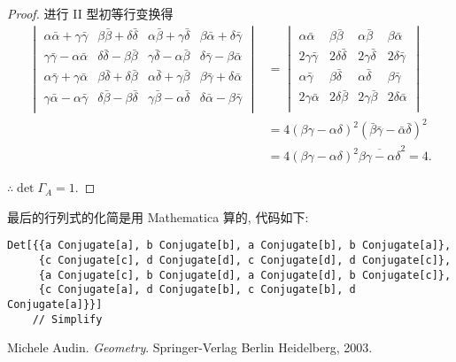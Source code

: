 \documentclass{ctexart}
\begin{document}
\begin{proof}
    进行 II 型初等行变换得
    \begin{align*}
        \begin{vmatrix}
            \alpha\bar{\alpha}+\gamma\bar{\gamma} & \beta\bar{\beta}+\delta\bar{\delta} & \alpha\bar{\beta}+\gamma\bar{\delta} & \beta\bar{\alpha}+\delta\bar{\gamma} \\
            \gamma\bar{\gamma}-\alpha\bar{\alpha} & \delta\bar{\delta}-\beta\bar{\beta} & \gamma\bar{\delta}-\alpha\bar{\beta} & \delta\bar{\gamma}-\beta\bar{\alpha} \\
            \alpha\bar{\gamma}+\gamma\bar{\alpha} & \beta\bar{\delta}+\delta\bar{\beta} & \alpha\bar{\delta}+\gamma\bar{\beta} & \beta\bar{\gamma}+\delta\bar{\alpha} \\
            \gamma\bar{\alpha}-\alpha\bar{\gamma} & \delta\bar{\beta}-\beta\bar{\delta} & \gamma\bar{\beta}-\alpha\bar{\delta} & \delta\bar{\alpha}-\beta\bar{\gamma} \\
        \end{vmatrix} & =\begin{vmatrix}
            \alpha\bar{\alpha} & \beta\bar{\beta} & \alpha\bar{\beta} & \beta\bar{\alpha} \\
            2\gamma\bar{\gamma} & 2\delta\bar{\delta} & 2\gamma\bar{\delta} & 2\delta\bar{\gamma} \\
            \alpha\bar{\gamma} & \beta\bar{\delta} & \alpha\bar{\delta} & \beta\bar{\gamma} \\
            2\gamma\bar{\alpha} & 2\delta\bar{\beta} & 2\gamma\bar{\beta} & 2\delta\bar{\alpha} \\
        \end{vmatrix} \\
        & =4(\beta\gamma-\alpha\delta)^2(\bar{\beta}\bar{\gamma}-\bar{\alpha}\bar{\delta})^2 \\
        & =4(\beta\gamma-\alpha\delta)^2\overline{\beta\gamma-\alpha\delta}^2=4.
    \end{align*}

    $\therefore\det\Gamma_A=1$.
\end{proof}
\begin{note}
    最后的行列式的化简是用 Mathematica 算的, 代码如下:
    \begin{verbatim}
Det[{{a Conjugate[a], b Conjugate[b], a Conjugate[b], b Conjugate[a]},
     {c Conjugate[c], d Conjugate[d], c Conjugate[d], d Conjugate[c]},
     {a Conjugate[c], b Conjugate[d], a Conjugate[d], b Conjugate[c]},
     {c Conjugate[a], d Conjugate[b], c Conjugate[b], d Conjugate[a]}}]
    // Simplify
    \end{verbatim}
\end{note}
\begin{thebibliography}{99}
     Michele Audin. \textit{Geometry}. Springer-Verlag Berlin Heidelberg, 2003.
\end{thebibliography}
\end{document}
